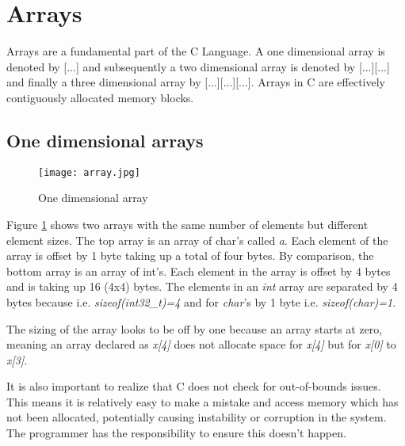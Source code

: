 \section{Arrays}

Arrays are a fundamental part of the C Language. A one dimensional array is denoted by [...] and subsequently a two dimensional array is denoted by [...][...] and finally a three dimensional array by [...][...][...]. Arrays in C are effectively contiguously allocated memory blocks. 

\subsection{One dimensional arrays}

\begin{figure}[H]
\centerline{\texttt{[image: array.jpg]}}
\caption{One dimensional array}
\label{array}
\end{figure}

Figure \ref{array} shows two arrays with the same number of elements but different element sizes. The top array is an array of char's called \textit{a}. Each element of the array is offset by 1 byte taking up a total of four bytes. By comparison, the bottom array is an array of int's. Each element in the array is offset by 4 bytes and is taking up 16 (4x4) bytes. The elements in an \textit{int} array are separated by 4 bytes because i.e. \textit{sizeof(int32\_t)=4}		and for \textit{char}'s by 1 byte i.e. \textit{sizeof(char)=1}.

The sizing of the array looks to be off by one because an array starts at zero, meaning an array declared as \textit{x[4]} does not allocate space for \textit{x[4]} but for \textit{x[0]} to \textit{x[3]}. 

It is also important to realize that C does not check for out-of-bounds issues. This means it is relatively easy to make a mistake and access memory which has not been allocated, potentially causing instability or corruption in the system. The programmer has the responsibility to ensure this doesn't happen.

